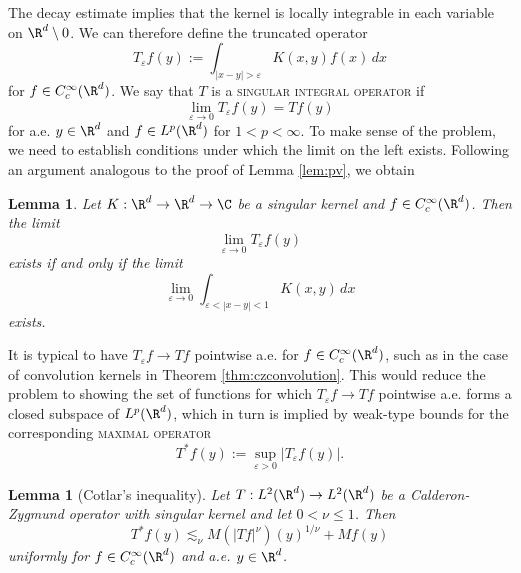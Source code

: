 \documentclass[reqno]{amsart}
\newtheorem{lemma}[theorem]{Lemma}
\theoremstyle{definition}
\theoremstyle{remark}
\newcounter{problem}[section]	\declaretheorem[style=thmrecbox,name=Problem, numberlike=problem]{statement}
\renewcommand{\epsilon}{\varepsilon}
\renewcommand{\emph}{\textsc}
\begin{document}
The decay estimate implies that the kernel is locally integrable in each variable on $\R^d \setminus 0$. We can therefore define the truncated operator
	\[ T_\epsilon f(y) := \int_{|x - y| > \epsilon} K(x, y) f(x) \, dx \]
for $f \in C^\infty_c (\R^d)$. We say that $T$ is a \emph{singular integral operator} if 
	\[ \lim_{\epsilon \to 0} T_\epsilon f(y) = Tf(y) \]
for a.e. $y \in \R^d$ and $f \in L^p (\R^d)$ for $1 < p < \infty$. To make sense of the problem, we need to establish conditions under which the limit on the left exists. Following an argument analogous to the proof of Lemma \ref{lem:pv}, we obtain
\begin{lemma}
	Let $K : \R^d \to \R^d \to \C$ be a singular kernel and $f \in C^\infty_c (\R^d)$. Then the limit
		\[ \lim_{\epsilon \to 0} T_\epsilon f(y)\]
	exists if and only if the limit 	
		\[ \lim_{\epsilon \to 0} \int_{\epsilon < |x - y| < 1} K(x, y) \, dx \]	
	exists.	
\end{lemma}

It is typical to have $T_\epsilon f \to Tf$ pointwise a.e. for $f \in C^\infty_c (\R^d)$, such as in the case of convolution kernels in Theorem \ref{thm:czconvolution}. This would reduce the problem to showing the set of functions for which $T_\epsilon f \to Tf$ pointwise a.e. forms a closed subspace of $L^p (\R^d)$, which in turn is implied by weak-type bounds for the corresponding \emph{maximal operator}
	\[ T^* f(y) := \sup_{\epsilon > 0} |T_\epsilon f(y)|.\]	

\begin{lemma}[Cotlar's inequality]
	Let $T : L^2 (\R^d) \to L^2 (\R^d)$ be a Calderon-Zygmund operator with singular kernel and let $0 < \nu \leq 1$. Then 
		\[ T^* f(y) \lesssim_\nu M(|Tf|^\nu) (y)^{1/\nu} + Mf(y) \]
	uniformly for $f \in C^\infty_c (\R^d)$ and a.e. $y \in \R^d$. 
\end{lemma}
\end{document}

